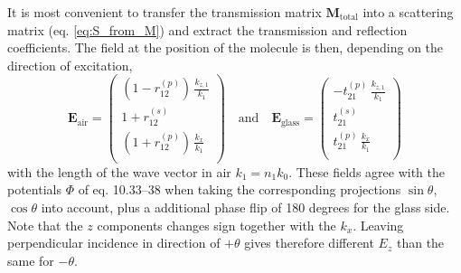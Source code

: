 It is most convenient to transfer the transmission matrix $\mathbf{M}_\text{total}$ into a scattering matrix (eq. \ref{eq:S_from_M}) and extract the transmission and reflection coefficients. The field at the position of the molecule is then, depending on the direction of excitation,
\begin{equation}
\mathbf{E}_\text{air}=
\begin{pmatrix}
\left(1 - r_{12}^{(p)} \right) \,  \frac{ k_{z,1}}{  k_1} \\ 
 1 + r_{12}^{(s)}      \\
 \left (1 + r_{12}^{(p)} \right)  \, \frac{ k_{x}}{  k_1}  \\
\end{pmatrix}
\quad 
\text{and}
\quad
\mathbf{E}_\text{glass}=
\begin{pmatrix}
- t_{21}^{(p)}  \,  \frac{ k_{z,1}}{  k_1} \\ 
 t_{21} ^{(s)}  
  \\  t_{21}^{(p)}   \, \frac{ k_{x}}{  k_1}  \\
\end{pmatrix}
\end{equation}
with the length of the wave vector in air $k_1 = n_1 k_0$.
These fields agree with the potentials $\Phi$ of \cite{Novotny-Hecht2012} eq. 10.33--38 when taking the corresponding projections $\sin \theta$, $\cos \theta$ into account, plus a additional phase flip of 180 degrees for the glass side. Note that the $z$ components changes sign together with the $k_x$. Leaving perpendicular incidence in direction of $+\theta$ gives therefore different $E_z$ than the same for $-\theta$.

